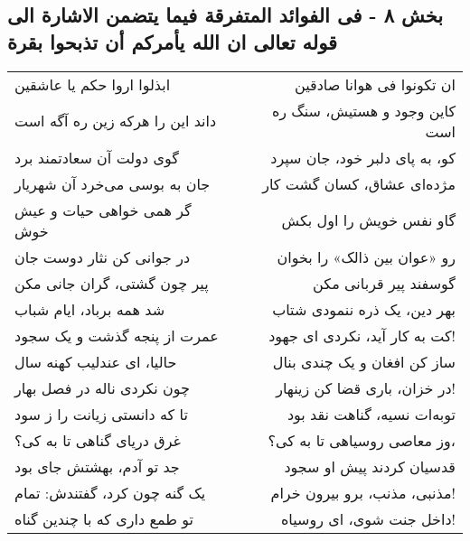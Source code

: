 \begin{center}
\section*{بخش ۸ - فی الفوائد المتفرقة فیما یتضمن الاشارة الی  قوله تعالی ان الله یأمرکم أن تذبحوا بقرة}
\label{sec:008}
\begin{longtable}{l p{0.5cm} r}
ابذلوا اروا حکم یا عاشقین
&&
ان تکونوا فی هوانا صادقین
\\
داند این را هرکه زین ره آگه است
&&
کاین وجود و هستیش، سنگ ره است
\\
گوی دولت آن سعادتمند برد
&&
کو، به پای دلبر خود، جان سپرد
\\
جان به بوسی می‌خرد آن شهریار
&&
مژده‌ای عشاق، کسان گشت کار
\\
گر همی خواهی حیات و عیش خوش
&&
گاو نفس خویش را اول بکش
\\
در جوانی کن نثار دوست جان
&&
رو «عوان بین ذالک» را بخوان
\\
پیر چون گشتی، گران جانی مکن
&&
گوسفند پیر قربانی مکن
\\
شد همه برباد، ایام شباب
&&
بهر دین، یک ذره ننمودی شتاب
\\
عمرت از پنجه گذشت و یک سجود
&&
کت به کار آید، نکردی ای جهود!
\\
حالیا، ای عندلیب کهنه سال
&&
ساز کن افغان و یک چندی بنال
\\
چون نکردی ناله در فصل بهار
&&
در خزان، باری قضا کن زینهار!
\\
تا که دانستی زیانت را ز سود
&&
توبه‌ات نسیه، گناهت نقد بود
\\
غرق دریای گناهی تا به کی؟
&&
وز معاصی روسیاهی تا به کی؟،
\\
جد تو آدم، بهشتش جای بود
&&
قدسیان کردند پیش او سجود
\\
یک گنه چون کرد، گفتندش: تمام
&&
مذنبی، مذنب، برو بیرون خرام!
\\
تو طمع داری که با چندین گناه
&&
داخل جنت شوی، ای روسیاه!
\\
\end{longtable}
\end{center}
